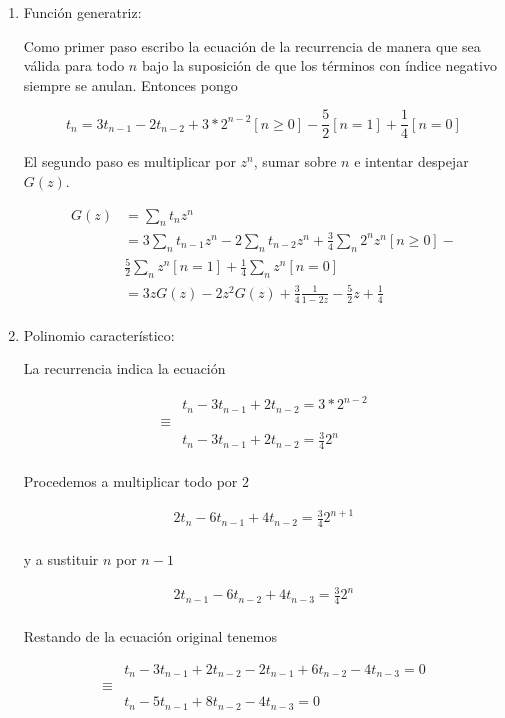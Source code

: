 \documentclass{article}
\begin{document}
\begin{enumerate}

\item Función generatriz:

Como primer paso escribo la ecuación de la recurrencia de manera que sea válida
para todo $n$ bajo la suposición de que los términos con índice negativo siempre
se anulan. Entonces pongo

\[
t_n = 3t_{n-1} - 2t_{n-2} + 3*2^{n-2} [n \geq 0] - \frac{5}{2} [n=1] + \frac{1}{4}[n=0]
\]

El segundo paso es multiplicar por $z^n$, sumar sobre $n$ e intentar despejar $G(z)$.

\begin{align*}
G(z)
  & = \sum_n t_n z^n \\
  & = 3 \sum_n t_{n-1} z^n - 2 \sum_n t_{n-2} z^n + \frac{3}{4} \sum_n 2^n z^n [n \geq 0] - \\
  &   \frac{5}{2} \sum_n z^n [n=1] + \frac{1}{4} \sum_n z^n [n=0] \\
  & = 3zG(z) - 2z^2G(z) + \frac{3}{4}\frac{1}{1-2z} - \frac{5}{2}z + \frac{1}{4} \\
\end{align*}

\item Polinomio característico:

La recurrencia indica la ecuación

\begin{align*}
& t_n - 3t_{n-1} + 2t_{n-2} = 3*2^{n-2} \\
\equiv & \\
& t_n - 3t_{n-1} + 2t_{n-2} = \frac{3}{4} 2^n \\
\end{align*}

Procedemos a multiplicar todo por $2$

\begin{align*}
2t_n - 6t_{n-1} + 4t_{n-2} = \frac{3}{4} 2^{n+1} \\
\end{align*}

y a sustituir $n$ por $n-1$

\begin{align*}
2t_{n-1} - 6t_{n-2} + 4t_{n-3} = \frac{3}{4} 2^{n} \\
\end{align*}

Restando de la ecuación original tenemos

\begin{align*}
& t_n - 3t_{n-1} +2t_{n-2} -2t_{n-1}+6t_{n-2}-4t_{n-3} = 0 \\
\equiv & \\
& t_n - 5t_{n-1} + 8t_{n-2}-4t_{n-3} = 0 \\
\end{align*}


\end{enumerate}
\end{document}
